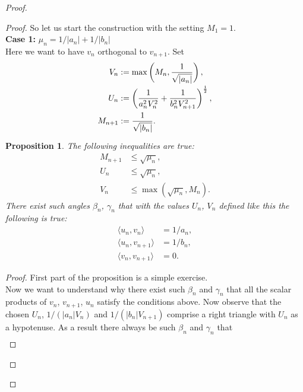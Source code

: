 \documentclass[12pt]{article}
\renewcommand{\leq}{\leqslant}
\newtheorem{prop}{Proposition}
\theoremstyle{definition}
\numberwithin{remark}{section}
\numberwithin{theorem}{section}
\numberwithin{prop}{section}
\numberwithin{equation}{section}
\numberwithin{lemma}{section}
\numberwithin{prop_under_lemma}{lemma}
\begin{document}
\begin{proof}
\begin{proof}
            So let us start the construction with the setting $M_1 = 1$.\\
            \textbf{Case 1:} $\mu_n = 1/|a_n| + 1/|b_n|$\\
                Here we want to have $v_n$ orthogonal to $v_{n+1}$.
                Set
                \begin{align*}
                    V_n &:= \max\left(M_n, \frac{1}{\sqrt{\smash[b]{|a_n|}}}\right),\\
                    U_n &:= \left(\frac{1}{a_n^2 V_n^2} + \frac{1}{b_n^2 V_{n+1}^2}\right)^\frac{1}{2},\\
                    M_{n+1} &:= \frac{1}{\sqrt{\smash[b]{|b_n|}}}.
                \end{align*}
                \begin{prop}
                    The following inequalities are true:
                    \begin{align*}
                        M_{n+1} &\leq \sqrt{\mu_n},\\
                        U_n &\leq \sqrt{\mu_n},\\
                        V_n &\leq \max(\sqrt{\mu_n}, M_n).
                    \end{align*}
                    There exist such angles $\beta_n$, $\gamma_n$ that with the values $U_n$, $V_n$ defined like this the following is true:
                    \begin{align*}
                        \langle u_n, v_n \rangle &= 1/a_n,\\
                        \langle u_n, v_{n+1} \rangle &= 1/b_n,\\
                        \langle v_n, v_{n+1} \rangle &= 0.
                    \end{align*}
                \end{prop}
                \begin{proof}
                    First part of the proposition is a simple exercise.\\
                    Now we want to understand why there exist such $\beta_n$ and $\gamma_n$ that all the scalar products of
                    $v_n$, $v_{n+1}$, $u_n$ satisfy the conditions above.
                    Now observe that the chosen $U_n$, $1/(|a_n| V_n)$ and $1/(|b_n| V_{n+1})$ 
                    comprise a right triangle with $U_n$ as a hypotenuse.
                    As a result there always be such $\beta_n$ and $\gamma_n$ that
                    \begin{align*}

\end{align*}
\end{proof}
\end{proof}
\end{proof}
\end{document}
